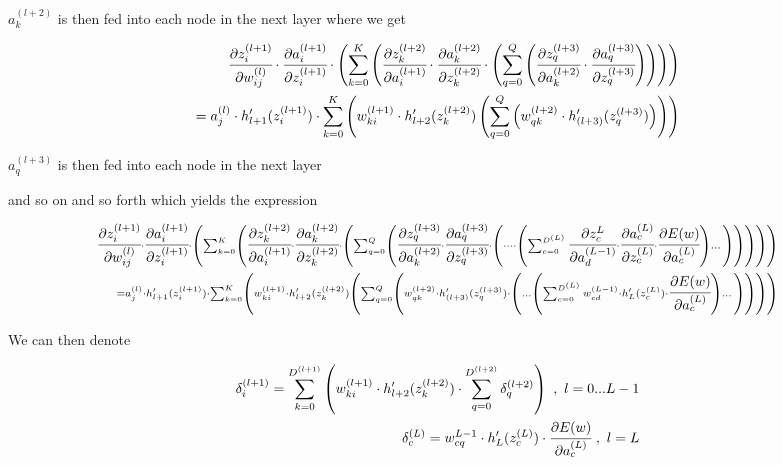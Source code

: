\documentclass[12pt,a4paper]{report}
\begin{document}
\(a_{k}^{(l+2)}\) is then fed into each node in the next layer where we get 


\setcounter{equation}{0}
\begin{align*}
	\cfrac{\partial z_{i}^{(l+1)}}{\partial w_{ij}^{(l)}} \cdot \cfrac{\partial a_{i}^{(l+1)}}{\partial z_{i}^{(l+1)}} \cdot \left( \sum_{k=0}^{K} \left(\cfrac{\partial z_{k}^{(l+2)}}{\partial a_{i}^{(l+1)}} \cdot \cfrac{\partial a_{k}^{(l+2)}}{\partial z_{k}^{(l+2)}} \cdot \left( \sum_{q=0}^{Q} \left(\cfrac{\partial z_{q}^{(l+3)}}{\partial a_{k}^{(l+2)}} \cdot \cfrac{\partial a_{q}^{(l+3)}}{\partial z_{q}^{(l+3)}}\right)\right)\right)\right)\\
= a_{j}^{(l)} \cdot h_{l+1}'(z_{i}^{(l+1)}) \cdot \sum_{k=0}^{K} \left(w_{ki}^{(l+1)} \cdot h_{l+2}'(z_{k}^{(l+2)}) \left(\sum_{q=0}^{Q} \left(w_{qk}^{(l+2)} \cdot h'_{(l+3)}(z_{q}^{(l+3)})\right) \right)\right)
\end{align*}

\( a_{q}^{(l+3)} \) is then fed into each node in the next layer

and so on and so forth which yields the expression


\setcounter{equation}{0}
\begin{align*}
\scriptstyle 	\cfrac{\partial z_{i}^{(l+1)}}{\partial w_{ij}^{(l)}} \cdot \cfrac{\partial a_{i}^{(l+1)}}{\partial z_{i}^{(l+1)}} \cdot \left( \sum_{k=0}^{K} \left(\cfrac{\partial z_{k}^{(l+2)}}{\partial a_{i}^{(l+1)}} \cdot \cfrac{\partial a_{k}^{(l+2)}}{\partial z_{k}^{(l+2)}} \cdot \left( \sum_{q=0}^{Q} \left(\cfrac{\partial z_{q}^{(l+3)}}{\partial a_{k}^{(l+2)}} \cdot \cfrac{\partial a_{q}^{(l+3)}}{\partial z_{q}^{(l+3)}} \cdot 
	\left(\dots \cdot \left( \sum_{c=0}^{D^{(L)}} \cfrac{\partial z_{c}^{L}}{\partial a_{d}^{(L-1)}} \cdot \cfrac{\partial a_{c}^{(L)}}{\partial z_{c}^{(L)}} \cdot \cfrac{\partial E(w)}{\partial a_{c}^{(L)}}   \right) \dots \right) \right)\right)\right)\right)\\
\scriptstyle = a_{j}^{(l)} \cdot h_{l+1}'(z_{i}^{(l+1)}) \cdot \sum_{k=0}^{K} \left(w_{ki}^{(l+1)} \cdot h_{l+2}'(z_{k}^{(l+2)}) \left(\sum_{q=0}^{Q} \left(w_{qk}^{(l+2)} \cdot h'_{(l+3)}(z_{q}^{(l+3)}) \cdot \left(\dots \left(\sum_{c=0}^{D^{(L)}} w_{cd}^{(L-1)} \cdot h'_{L}(z_{c}^{(L)}) \cdot \cfrac{\partial E(w)}{\partial a_{c}^{(L)}}\right)\dots \right)\right) \right)\right)
\end{align*}

We can then denote

\setcounter{equation}{0}
\begin{align*}
	\delta_{i}^{(l+1)} = \sum_{k=0}^{D^{(l+1)}} \left(w_{ki}^{(l+1)} \cdot h'_{l+2}(z_{k}^{(l+2)}) \cdot \sum_{q=0}^{D^{(l+2)}} \delta_{q}^{(l+2)} \right)~,~
	l = 0...L-1\\
\delta_{c}^{(L)} = w_{cq}^{L-1} \cdot h_{L}'(z_{c}^{(L)}) \cdot \cfrac{\partial E(w)}{\partial a_{c}^{(L)}}~,~ l=L
\end{align*}
\end{document}
